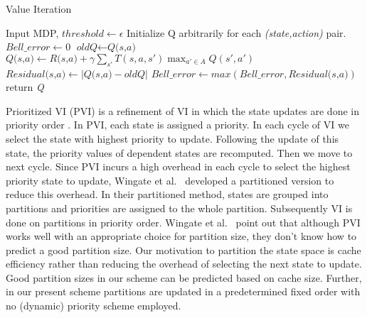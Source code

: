 \documentclass[conference]{IEEEtran}
\begin{document}
\begin{algorithm}
\caption{Value Iteration}
\label{alg:VI}
\begin{algorithmic}[1]
\State Input MDP, $threshold \gets \epsilon$
\State Initialize Q arbitrarily for each \textit{(state,action)} pair.
	\State $\textit{Bell\_error} \leftarrow 0$
		\State $\textit{oldQ} \leftarrow \textit{Q(s,a)}$
		\State $\textit{Q(s,a)} \leftarrow \textit{R(s,a)} + \gamma \sum\limits_{s'} T(s,a,s')  {\displaystyle\max_{a'\in A} } Q(s',a')$
		\State $\textit{Residual(s,a)} \leftarrow |\textit{Q(s,a)} - \textit{oldQ}|$
		\State $\textit{Bell\_error} \leftarrow max(\textit{Bell\_error} , \textit{Residual(s,a)})$
	\EndFor
		\State return \textit{Q}
	\EndIf
\EndWhile
\end{algorithmic}
\end{algorithm}
Prioritized VI (PVI) is a refinement of VI in which the state updates are done in priority order \cite{suttonbook}. In PVI,
each state is assigned a priority. In each cycle of VI we select the state with highest priority to update. Following the update of this state, the priority values of dependent states are recomputed. Then we move to next cycle.
Since PVI incurs a high overhead in each cycle to select the highest priority state to update, Wingate et al.~\cite{wingate_seppi2} developed
a partitioned version to reduce this overhead. In their partitioned method, states are grouped into partitions and priorities are assigned to the
whole partition. Subsequently VI is done on partitions in priority order. 
Wingate et al.~\cite{wingate_seppi2} point out that although PVI works well with
an appropriate choice for partition size, they don't know how to predict a good partition size.
Our motivation to partition the state space is cache efficiency rather than reducing the overhead of selecting the next state to update.
Good partition sizes in our scheme can be predicted based on cache size. Further, in our present scheme partitions are updated in a predetermined fixed order
with no (dynamic) priority scheme employed.
\end{document}
